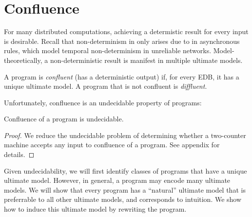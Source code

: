 \section{Confluence}

For many distributed computations, achieving a determistic result for every input is desirable.  Recall that non-determinism in \lang only arises due to  in asynchronous rules, 
which model temporal non-determinism in unreliable networks.
Model-theoretically, a non-deterministic result is manifest in multiple ultimate models.

\begin{definition}
A \lang program is {\em confluent} (has a deterministic output) if, for every EDB, it has a unique ultimate model.  A program that is not confluent is {\em diffluent}.
\end{definition}

Unfortunately, confluence is an undecidable property of \lang programs:

\begin{lemma}
\label{lem:confluence-undecidable}
Confluence of a \lang program is undecidable.
\end{lemma}
\begin{proof}
We reduce the undecidable problem of determining whether a two-counter machine accepts any input to confluence of a \lang program.  See appendix for details.
\end{proof}

Given undecidability, we will first identify classes of programs that have a unique ultimate model.  However, in general, a \lang program may encode many ultimate models.  We will show that every \lang program has a ``natural'' ultimate model that is preferrable to all other ultimate models, and corresponds to intuition.  We show how to induce this ultimate model by rewriting the program.


